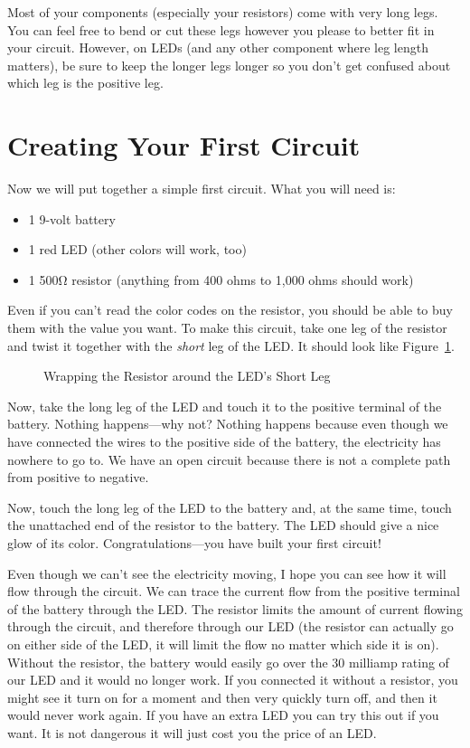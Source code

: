 Most of your components (especially your resistors) come with very long legs.
You can feel free to bend or cut these legs however you please to better fit in your circuit.
However, on LEDs (and any other component where leg length matters), be sure to keep the longer legs longer so you don't get confused about which leg is the positive leg.

\section{Creating Your First Circuit}

Now we will put together a simple first circuit.
What you will need is:
\begin{itemize}
\item 1 9-volt battery
\item 1 red LED (other colors will work, too)
\item 1 500\si{\ohm} resistor (anything from 400 ohms to 1,000 ohms should work)
\end{itemize}

Even if you can't read the color codes on the resistor, you should be able to buy them with the value you want.
To make this circuit, take one leg of the resistor and twist it together with the \emph{short} leg of the LED.
It should look like Figure~\ref{figLEDWrapped}.

\begin{figure}
\caption{Wrapping the Resistor around the LED's Short Leg}
\label{figLEDWrapped}
\end{figure}

Now, take the long leg of the LED and touch it to the positive terminal of the battery.
Nothing happens---why not?
Nothing happens because even though we have connected the wires to the positive side of the battery, the electricity has nowhere to go to.
We have an open circuit because there is not a complete path from positive to negative.

Now, touch the long leg of the LED to the battery and, at the same time, touch the unattached end of the resistor to the battery.
The LED should give a nice glow of its color.
Congratulations---you have built your first circuit!

Even though we can't see the electricity moving, I hope you can see how it will flow through the circuit.
We can trace the current flow from the positive terminal of the battery through the LED.
The resistor limits the amount of current flowing through the circuit, and therefore through our LED (the resistor can actually go on either side of the LED, it will limit the flow no matter which side it is on).
Without the resistor, the battery would easily go over the 30 milliamp rating of our LED and it would no longer work.  
If you connected it without a resistor, you might see it turn on for a moment and then very quickly turn off, and then it would never work again.
If you have an extra LED you can try this out if you want.
It is not dangerous it will just cost you the price of an LED.

